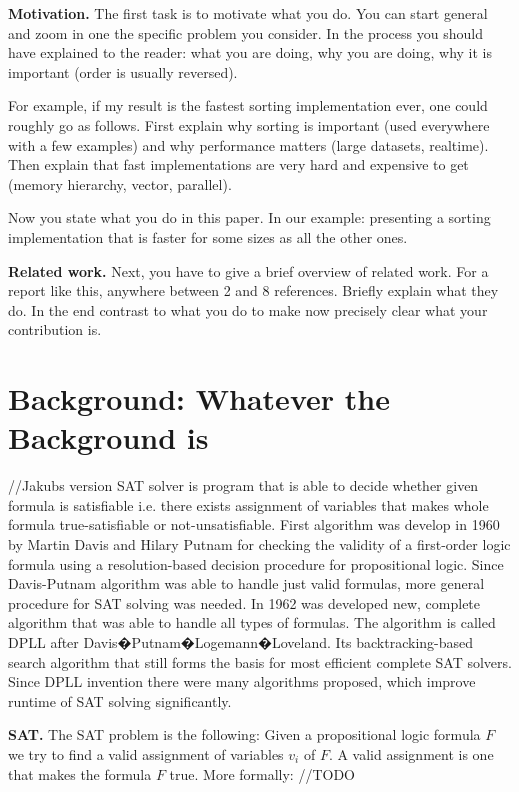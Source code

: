 \documentclass[letterpaper]{article}
\newcommand{\mypar}[1]{{\bf #1.}}
\begin{document}
\mypar{Motivation} The first task is to motivate what you do.  You can
start general and zoom in one the specific problem you consider.  In
the process you should have explained to the reader: what you are doing,
why you are doing, why it is important (order is usually reversed).

For example, if my result is the fastest sorting implementation ever, one
could roughly go as follows. First explain why sorting is important
(used everywhere with a few examples) and why performance matters (large datasets,
realtime). Then explain that fast implementations are very hard and
expensive to get (memory hierarchy, vector, parallel). 

Now you state what you do in this paper. In our example: 
presenting a sorting implementation that is
faster for some sizes as all the other ones.

\mypar{Related work} Next, you have to give a brief overview of
related work. For a report like this, anywhere between 2 and 8
references. Briefly explain what they do. In the end contrast to what
you do to make now precisely clear what your contribution is.

\section{Background: Whatever the Background is}\label{sec:background}

//Jakubs version
SAT solver is program that is able to decide whether given formula is satisfiable i.e. there exists assignment of variables that makes whole formula true-satisfiable or not-unsatisfiable.
First algorithm was develop in 1960 by Martin Davis and Hilary Putnam for checking the validity of a first-order logic formula using a resolution-based decision procedure for propositional logic.
Since Davis-Putnam algorithm was able to handle just valid formulas, more general procedure for SAT solving was needed. In 1962 was developed new, complete algorithm that was able to handle all types of formulas. The algorithm is called DPLL after Davis�Putnam�Logemann�Loveland. Its  backtracking-based search algorithm that still forms the basis for most efficient complete SAT solvers. Since DPLL invention there were many algorithms proposed, which improve runtime of SAT solving significantly.

\mypar{SAT}
The SAT problem is the following:
Given a propositional logic formula $F$ we try to find a valid assignment of variables $v_i$ of $F$.
A valid assignment is one that makes the formula $F$ true.
More formally: //TODO
\end{document}
